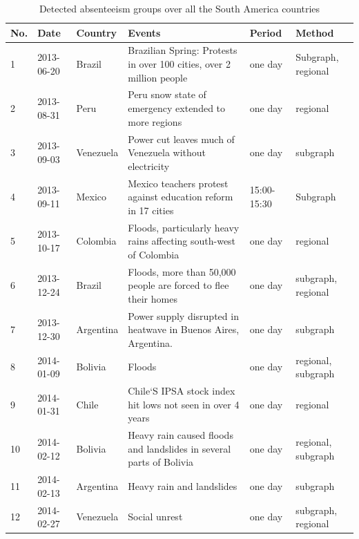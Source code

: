 \begin{table}[t] %
	\renewcommand{\arraystretch}{1}
	\caption{\label{table:list_events} Detected absenteeism groups over all the South America countries}
	\scriptsize
	\centering
	\begin{tabular}{ p{0.4cm}|l|l| p{8cm}|l | l}
		\hline
		\textbf{No.} & \textbf{Date}& \textbf{Country}& \textbf{ Events} & \textbf{ Period}  &  \textbf{ Method}   \\ [1ex]
		\hline
        1& 2013-06-20 & Brazil & Brazilian Spring: Protests in over 100 cities, over 2 million people &one day& Subgraph, regional \\
        2& 2013-08-31 & Peru & Peru snow state of emergency extended to more regions & one day&regional \\
        3& 2013-09-03 & Venezuela & Power cut leaves much of Venezuela without electricity &one day& subgraph\\
		4& 2013-09-11 & Mexico & Mexico teachers protest against education reform in 17 cities &15:00-15:30 &Subgraph \\
        5& 2013-10-17 & Colombia & Floods, particularly heavy rains affecting south-west of Colombia & one day& regional \\
        6& 2013-12-24 & Brazil & Floods, more than 50,000 people are forced to flee their homes&one day& subgraph, regional \\
        7& 2013-12-30 & Argentina &  Power supply disrupted in heatwave in Buenos Aires, Argentina. &one day&subgraph\\
        8& 2014-01-09 & Bolivia & Floods & one day&regional, subgraph \\
        9& 2014-01-31 & Chile & Chile`S IPSA stock index hit lows not seen in over 4 years & one day&regional\\
        10& 2014-02-12 & Bolivia & Heavy rain caused floods and landslides in several parts of Bolivia &one day& regional, subgraph\\
        11 & 2014-02-13 & Argentina & Heavy rain and landslides & one day&subgraph\\
        12& 2014-02-27 & Venezuela & Social unrest & one day&subgraph, regional \\

\end{tabular}
\end{table}

